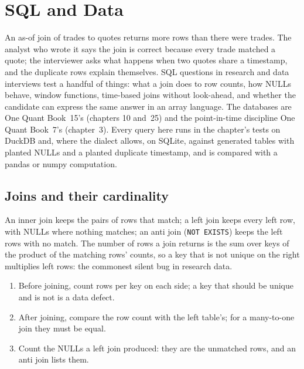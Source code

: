 \chapter{SQL and Data}\label{ch:iv:sql-and-data}

An as-of join of trades to quotes returns more rows than there were trades. The analyst who wrote it says the join is correct
because every trade matched a quote; the interviewer asks what happens when two quotes share a timestamp, and the duplicate rows
explain themselves. SQL questions in research and data interviews test a handful of things: what a join does to row counts, how
NULLs behave, window functions, time-based joins without look-ahead, and whether the candidate can express the same answer in an
array language. The databases are One Quant Book~15's (chapters 10 and~25) and the point-in-time discipline One Quant Book~7's
(chapter~3). Every query here runs in the chapter's tests on DuckDB and, where the dialect allows, on SQLite, against generated
tables with planted NULLs and a planted duplicate timestamp, and is compared with a pandas or numpy computation.

\section{Joins and their cardinality}

An inner join keeps the pairs of rows that match; a left join keeps every left row, with NULLs where nothing matches; an anti join
(\texttt{NOT EXISTS}) keeps the left rows with no match. The number of rows a join returns is the sum over keys of the product of
the matching rows' counts, so a key that is not unique on the right multiplies left rows: the commonest silent bug in research
data.

\label{lst:iv:sql-and-data:dup}

\begin{method}\label{met:iv:sql-and-data:join}
\begin{enumerate}
\item Before joining, count rows per key on each side; a key that should be unique and is not is a data defect.
\item After joining, compare the row count with the left table's; for a many-to-one join they must be equal.
\item Count the NULLs a left join produced: they are the unmatched rows, and an anti join lists them.
\end{enumerate}
\end{method}


